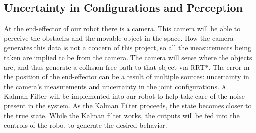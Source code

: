 \subsection{Uncertainty in Configurations and Perception}
At the end-effector of our robot there is a camera.  This camera will be able to perceive the obstacles and the movable object in the space.  How the camera generates this data is not a concern of this project, so all the measurements being taken are implied to be from the camera.  The camera will sense where the objects are, and thus generate a collision free path to that object via RRT*.  The error in the position of the end-effector can be a result of multiple sources: uncertainty in the camera's measurements and uncertainty in the joint configurations.  A Kalman Filter will be implemented into our robot to help take care of the noise present in the system.  As the Kalman Filter proceeds, the state becomes closer to the true state.  While the Kalman filter works, the outputs will be fed into the controls of the robot to generate the desired behavior.